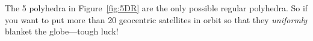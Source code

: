 The 5 polyhedra in Figure~\ref{fig:5DR} are the only possible regular
polyhedra.  So if you want to put more than 20 geocentric satellites
in orbit so that they \emph{uniformly} blanket the globe---tough luck!

\problemsection

\begin{problems}

\examproblems
{}

\classproblems
{}

\homeworkproblems
{}

\end{problems}


\endinput
